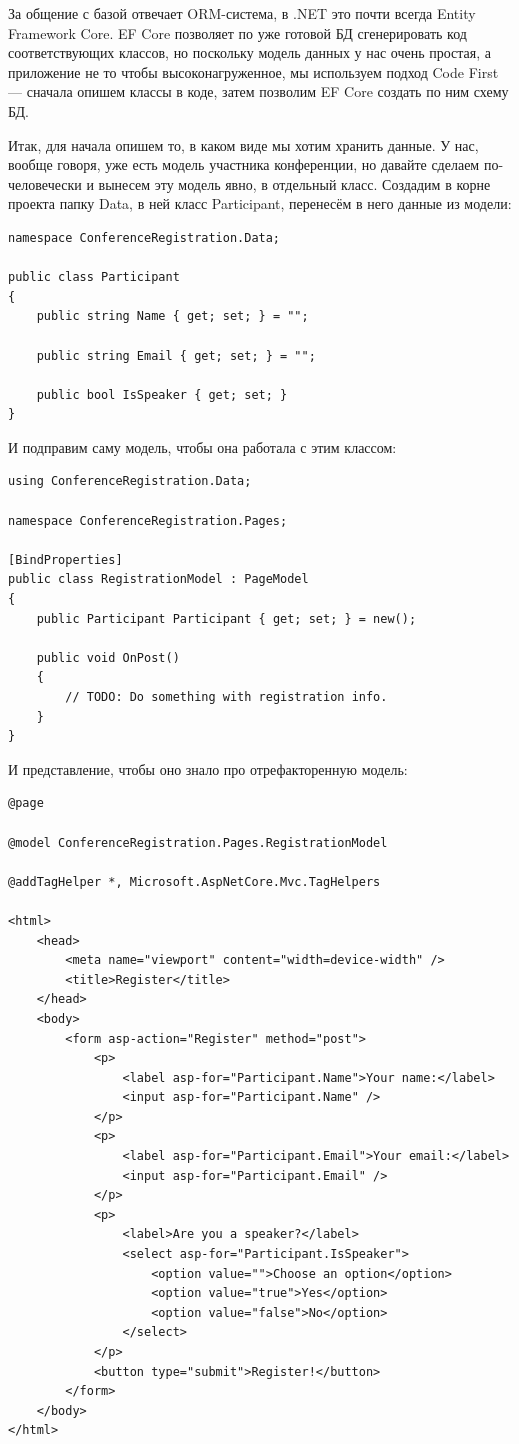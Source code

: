 \documentclass[a5paper]{article}
\begin{document}
За общение с базой отвечает ORM-система, в .NET это почти всегда Entity Framework Core. EF Core позволяет по уже готовой БД сгенерировать код соответствующих классов, но поскольку модель данных у нас очень простая, а приложение не то чтобы высоконагруженное, мы используем подход Code First --- сначала опишем классы в коде, затем позволим EF Core создать по ним схему БД.

Итак, для начала опишем то, в каком виде мы хотим хранить данные. У нас, вообще говоря, уже есть модель участника конференции, но давайте сделаем по-человечески и вынесем эту модель явно, в отдельный класс. Создадим в корне проекта папку Data, в ней класс Participant, перенесём в него данные из модели:

\begin{verbatim}
namespace ConferenceRegistration.Data;

public class Participant
{
    public string Name { get; set; } = "";

    public string Email { get; set; } = "";

    public bool IsSpeaker { get; set; }
}
\end{verbatim}

И подправим саму модель, чтобы она работала с этим классом:

\begin{verbatim}
using ConferenceRegistration.Data;

namespace ConferenceRegistration.Pages;

[BindProperties]
public class RegistrationModel : PageModel
{
    public Participant Participant { get; set; } = new();

    public void OnPost()
    {
        // TODO: Do something with registration info.
    }
}
\end{verbatim}

И представление, чтобы оно знало про отрефакторенную модель:

\begin{verbatim}
@page

@model ConferenceRegistration.Pages.RegistrationModel

@addTagHelper *, Microsoft.AspNetCore.Mvc.TagHelpers

<html>
    <head>
        <meta name="viewport" content="width=device-width" />
        <title>Register</title>
    </head>
    <body>
        <form asp-action="Register" method="post">
            <p>
                <label asp-for="Participant.Name">Your name:</label>
                <input asp-for="Participant.Name" />
            </p>
            <p>
                <label asp-for="Participant.Email">Your email:</label>
                <input asp-for="Participant.Email" />
            </p>
            <p>
                <label>Are you a speaker?</label>
                <select asp-for="Participant.IsSpeaker">
                    <option value="">Choose an option</option>
                    <option value="true">Yes</option>
                    <option value="false">No</option>
                </select>
            </p>
            <button type="submit">Register!</button>
        </form>
    </body>
</html>
\end{verbatim}
\end{document}
